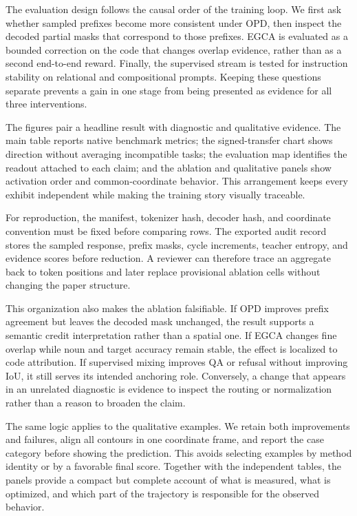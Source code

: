 \documentclass{article}
\begin{document}
The evaluation design follows the causal order of the training loop. We first ask whether sampled prefixes become more consistent under OPD, then inspect the decoded partial masks that correspond to those prefixes. EGCA is evaluated as a bounded correction on the code that changes overlap evidence, rather than as a second end-to-end reward. Finally, the supervised stream is tested for instruction stability on relational and compositional prompts. Keeping these questions separate prevents a gain in one stage from being presented as evidence for all three interventions.

The figures pair a headline result with diagnostic and qualitative evidence. The main table reports native benchmark metrics; the signed-transfer chart shows direction without averaging incompatible tasks; the evaluation map identifies the readout attached to each claim; and the ablation and qualitative panels show activation order and common-coordinate behavior. This arrangement keeps every exhibit independent while making the training story visually traceable.

For reproduction, the manifest, tokenizer hash, decoder hash, and coordinate convention must be fixed before comparing rows. The exported audit record stores the sampled response, prefix masks, cycle increments, teacher entropy, and evidence scores before reduction. A reviewer can therefore trace an aggregate back to token positions and later replace provisional ablation cells without changing the paper structure.

This organization also makes the ablation falsifiable. If OPD improves prefix agreement but leaves the decoded mask unchanged, the result supports a semantic credit interpretation rather than a spatial one. If EGCA changes fine overlap while noun and target accuracy remain stable, the effect is localized to code attribution. If supervised mixing improves QA or refusal without improving IoU, it still serves its intended anchoring role. Conversely, a change that appears in an unrelated diagnostic is evidence to inspect the routing or normalization rather than a reason to broaden the claim.

The same logic applies to the qualitative examples. We retain both improvements and failures, align all contours in one coordinate frame, and report the case category before showing the prediction. This avoids selecting examples by method identity or by a favorable final score. Together with the independent tables, the panels provide a compact but complete account of what is measured, what is optimized, and which part of the trajectory is responsible for the observed behavior.
\end{document}
